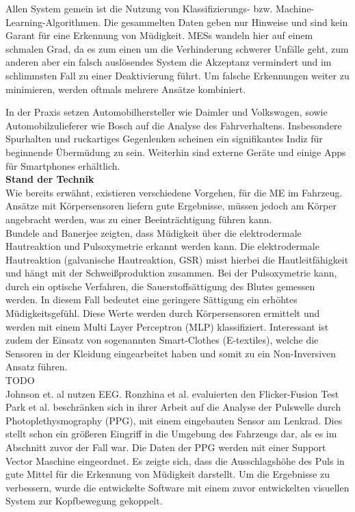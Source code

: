 {Allen System gemein ist die Nutzung von Klassifizierungs- bzw. Machine-Learning-Algorithmen. Die gesammelten Daten geben nur Hinweise und sind kein Garant für eine Erkennung von Müdigkeit. \acl{MESs} wandeln hier auf einem schmalen Grad, da es zum einen um die Verhinderung schwerer Unfälle geht, zum anderen aber ein falsch auslösendes System die Akzeptanz vermindert und im schlimmsten Fall zu einer Deaktivierung führt. Um falsche Erkennungen weiter zu minimieren, werden oftmals mehrere Ansätze kombiniert.

In der Praxis setzen Automobilhersteller wie Daimler \cite{Daimler} und Volkswagen, sowie Automobilzulieferer wie Bosch \cite{Bosch} auf die Analyse des Fahrverhaltens. Insbesondere Spurhalten und ruckartiges Gegenlenken scheinen ein signifikantes Indiz für beginnende Übermüdung zu sein. Weiterhin sind externe Geräte und einige Apps für Smartphones erhältlich. \\

\textbf{Stand der Technik} \\
Wie bereits erwähnt, existieren verschiedene Vorgehen, für die \acl{ME} im Fahrzeug. Ansätze mit Körpersensoren liefern gute Ergebnisse, müssen jedoch am Körper angebracht werden, was zu einer Beeinträchtigung führen kann.\\

Bundele and Banerjee \citep{Bundele:2009:DFV:1806338.1806478} zeigten, dass Müdigkeit über die elektrodermale Hautreaktion und Pulsoxymetrie erkannt werden kann. Die elektrodermale Hautreaktion (galvanische Hautreaktion, GSR) misst hierbei die Hautleitfähigkeit und hängt mit der Schweißproduktion zusammen. Bei der Pulsoxymetrie kann, durch ein optische Verfahren, die Sauerstoffsättigung des Blutes gemessen werden. In diesem Fall bedeutet eine geringere Sättigung ein erhöhtes Müdigkeitsgefühl. Diese Werte werden durch Körpersensoren ermittelt und werden mit einem Multi Layer Perceptron (MLP) klassifiziert. Interessant ist zudem der Einsatz von sogenannten Smart-Clothes (E-textiles), welche die Sensoren in der Kleidung eingearbeitet haben und somit zu ein Non-Inversiven Ansatz führen.\\

TODO\\
Johnson et. al \cite{Johnson11} nutzen EEG.
Ronzhina et al. \cite{Ronzhina:2011:UEV:2093698.2093733} evaluierten den Flicker-Fusion Test \\

Park et al. \cite{Park:2009:DDD:1667780.1667798} beschränken sich in ihrer Arbeit auf die Analyse der Pulswelle durch Photoplethysmography (PPG), mit einem eingebauten Sensor am Lenkrad. Dies stellt schon ein größeren Eingriff in die Umgebung des Fahrzeugs dar, als es im Abschnitt zuvor der Fall war. Die Daten der PPG werden mit einer Support Vector Maschine eingeordnet. Es zeigte sich, dass die Ausschlagshöhe des Puls in gute Mittel für die Erkennung von Müdigkeit darstellt. Um die Ergebnisse zu verbessern, wurde die entwickelte Software mit einem zuvor entwickelten visuellen System zur Kopfbewegung gekoppelt. \\

}

